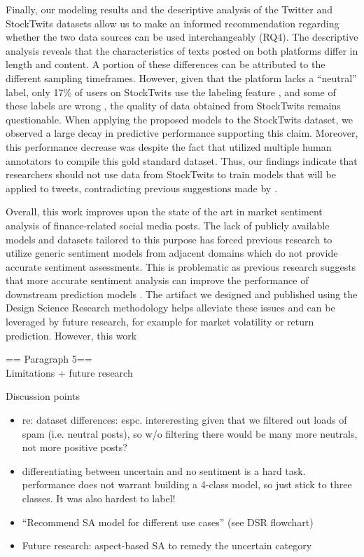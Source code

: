 Finally, our modeling results and the descriptive analysis of the Twitter and StockTwits datasets allow us to make an informed recommendation regarding whether the two data sources can be used interchangeably (RQ4). The descriptive analysis reveals that the characteristics of texts posted on both platforms differ in length and content. A portion of these differences can be attributed to the different sampling timeframes. However, given that the platform lacks a ``neutral'' label, only 17\% of users on StockTwits use the labeling feature , and some of these labels are wrong , the quality of data obtained from StockTwits remains questionable. When applying the proposed models to the StockTwits dataset, we observed a large decay in predictive performance supporting this claim. Moreover, this performance decrease was despite the fact that  utilized multiple human annotators to compile this gold standard dataset. Thus, our findings indicate that researchers should not use data from StockTwits to train models that will be applied to tweets, contradicting previous suggestions made by .


Overall, this work improves upon the state of the art in market sentiment analysis of finance-related social media posts. The lack of publicly available models and datasets tailored to this purpose has forced previous research to utilize generic sentiment models from adjacent domains which do not provide accurate sentiment assessments. This is problematic as previous research suggests that more accurate sentiment analysis can improve the performance of downstream prediction models . The artifact we designed and published using the Design Science Research methodology helps alleviate these issues and can be leveraged by future research, for example for market volatility or return prediction. However, this work 

== Paragraph 5==\\
Limitations + future research










\newpage
Discussion points
\begin{itemize}[noitemsep]
	\item re: dataset differences: espc. intereresting given that we filtered out loads of spam (i.e. neutral posts), so w/o filtering there would be many more neutrals, not more positive posts?
	\item differentiating between uncertain and no sentiment is a hard task. performance does not warrant building a 4-class model, so just stick to three classes. It was also hardest to label!
	\item ``Recommend SA model for different use cases'' (see DSR flowchart)
	\item Future research: aspect-based SA to remedy the uncertain category
\end{itemize}
